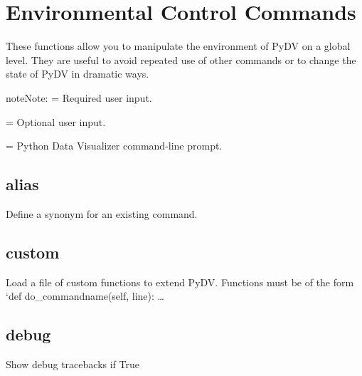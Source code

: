 \documentclass[letterpaper,10pt,english]{sphinxmanual}
\begin{document}
\section{Environmental Control Commands}
\label{\detokenize{env_control_cmds:environmental-control-commands}}\label{\detokenize{env_control_cmds:env-control-commands}}\label{\detokenize{env_control_cmds::doc}}
These functions allow you to manipulate the environment of PyDV on a global level. They are useful to avoid repeated use of other commands or to change the state of PyDV in dramatic ways.

\begin{sphinxadmonition}{note}{Note:}
\sphinxstylestrong{\textless{} \textgreater{}} = Required user input.

\sphinxstylestrong{{[} {]}} = Optional user input.

\sphinxstylestrong{{[}PyDV{]}:} = Python Data Visualizer command-line prompt.
\end{sphinxadmonition}


\subsection{alias}
\label{\detokenize{env_control_cmds:alias}}
Define a synonym for  an existing command.

\begin{sphinxVerbatim}[commandchars=\\\{\}]
\PYG{p}{[}\PYG{p}{]}   
\end{sphinxVerbatim}


\subsection{custom}
\label{\detokenize{env_control_cmds:custom}}
Load a file of custom functions to extend PyDV. Functions must be of the form ‘def do\_commandname(self, line): …

\begin{sphinxVerbatim}[commandchars=\\\{\}]
\PYG{p}{[}\PYG{p}{]}  
\end{sphinxVerbatim}


\subsection{debug}
\label{\detokenize{env_control_cmds:debug}}
Show debug tracebacks if True
\end{document}
